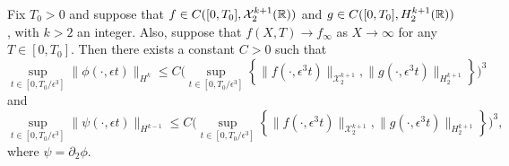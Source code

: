 \begin{prop}
	Fix \(T_0> 0\) and suppose that \(f \in C([0,T_0], \mathcal{X}_2^{k+1}(\mathbb{R}))\) and \(g \in C([0,T_0], H^{k+1}_2(\mathbb{R})) \), with \(k>2\) an integer. Also, suppose that \(f(X,T)\to f_\infty\) as \(X\to \infty\) for any \(T\in[0,T_0]\). Then there exists a constant \(C>0\) such that 
	\begin{equation}\label{phi-bound}
		\sup_{t\in[0,T_0/\epsilon^3]} \|\phi(\cdot,\epsilon t)\|_{H^k} \leq C \Bigg( \sup_{t\in[0,T_0/\epsilon^3]} \left\{\| f(\cdot, \epsilon^3t) \|_{\mathcal X^{k+1}_{2}},  \| g(\cdot, \epsilon^3t) \|_{H^{k+1}_2} \right\}\Bigg)^3
	\end{equation}
	and
	\begin{equation}\label{psi-bound}
		\sup_{t\in[0,T_0/\epsilon^3]} \|\psi(\cdot,\epsilon t)\|_{H^{k-1}} \leq C \Bigg( \sup_{t\in[0,T_0/\epsilon^3]} \left\{\| f(\cdot, \epsilon^3t) \|_{\mathcal X^{k+1}_{2}},  \| g(\cdot, \epsilon^3t) \|_{H^{k+1}_2} \right\}\Bigg)^3,
	\end{equation}
	where \(\psi = \partial_2 \phi\).
\end{prop}

